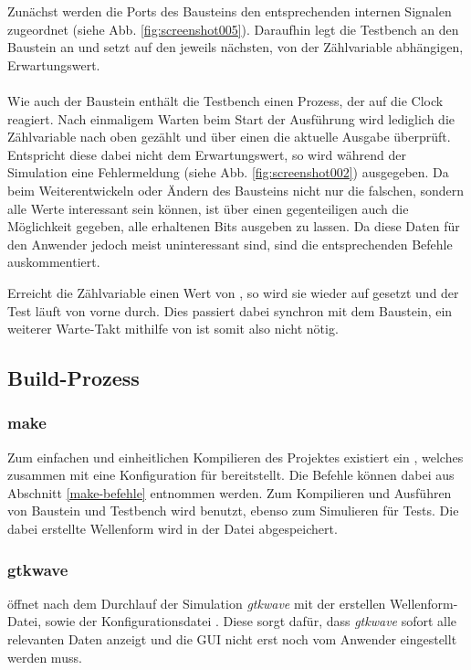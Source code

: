 \documentclass[a4paper]{article}
\begin{document}
		\noindent Zunächst werden die Ports des Bausteins den entsprechenden internen Signalen zugeordnet (siehe Abb. \ref{fig:screenshot005}). Daraufhin legt die Testbench  an den Baustein an 
		und setzt  auf den jeweils nächsten, von der Zählvariable abhängigen, Erwartungswert.\\ \\
		Wie auch der Baustein enthält die Testbench einen Prozess, der auf die Clock reagiert. 
		Nach einmaligem Warten beim Start der Ausführung wird lediglich die Zählvariable nach oben gezählt und über einen  die aktuelle Ausgabe überprüft. 
		Entspricht diese dabei nicht dem Erwartungswert, so wird während der Simulation eine Fehlermeldung (siehe Abb. \ref{fig:screenshot002}) ausgegeben. 
		Da beim Weiterentwickeln oder Ändern des Bausteins nicht nur die falschen, sondern alle Werte interessant sein können, 
		ist über einen gegenteiligen  auch die Möglichkeit gegeben, alle erhaltenen Bits ausgeben zu lassen. 
		Da diese Daten für den Anwender jedoch meist uninteressant sind, sind die entsprechenden Befehle auskommentiert.
        
		Erreicht die Zählvariable einen Wert von , so wird sie wieder auf  gesetzt und der Test läuft von vorne durch. 
		Dies passiert dabei synchron mit dem Baustein, ein weiterer Warte-Takt mithilfe von  ist somit also nicht nötig.
        
        \subsection{Build-Prozess} \label{KompilierProzess}
        	\subsubsection{make}
				Zum einfachen und einheitlichen Kompilieren des Projektes existiert ein , welches zusammen mit  eine Konfiguration für  bereitstellt. 
				Die Befehle können dabei aus Abschnitt \ref{make-befehle} entnommen werden. 
				Zum Kompilieren und Ausführen von Baustein und Testbench wird  benutzt, ebenso zum Simulieren für Tests. Die dabei erstellte Wellenform wird in der Datei  abgespeichert.
        	\subsubsection{gtkwave}
				 öffnet nach dem Durchlauf der Simulation \emph{gtkwave} mit der erstellen Wellenform-Datei, sowie der Konfigurationsdatei .
				 Diese sorgt dafür, dass \emph{gtkwave} sofort alle relevanten Daten anzeigt und die GUI nicht erst noch vom Anwender eingestellt werden muss.
\end{document}
